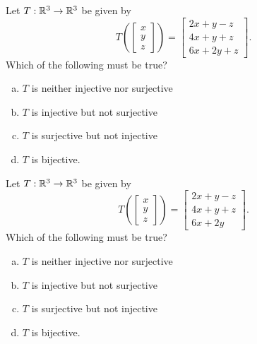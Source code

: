 \begin{applicationActivities}{3}{19}
\begin{activity}{5}
Let $T: \mathbb{R}^3 \rightarrow \mathbb{R}^3$ be given by $$T\left(\begin{bmatrix} x \\ y  \\ z \end{bmatrix} \right) = \begin{bmatrix} 2x+y-z \\ 4x+y+z \\ 6x+2y+z\end{bmatrix}.$$ Which of the following must be true?
\begin{enumerate}[(a)]
\item $T$ is neither injective nor surjective
\item $T$ is injective but not surjective
\item $T$ is surjective but not injective
\item $T$ is bijective.
\end{enumerate}
\end{activity}

\begin{activity}{5}
Let $T: \mathbb{R}^3 \rightarrow \mathbb{R}^3$ be given by $$T\left(\begin{bmatrix} x \\ y  \\ z \end{bmatrix} \right) = \begin{bmatrix} 2x+y-z \\ 4x+y+z \\ 6x+2y\end{bmatrix}.$$   Which of the following must be true?
\begin{enumerate}[(a)]
\item $T$ is neither injective nor surjective
\item $T$ is injective but not surjective
\item $T$ is surjective but not injective
\item $T$ is bijective.
\end{enumerate}
\end{activity}


\end{applicationActivities}
